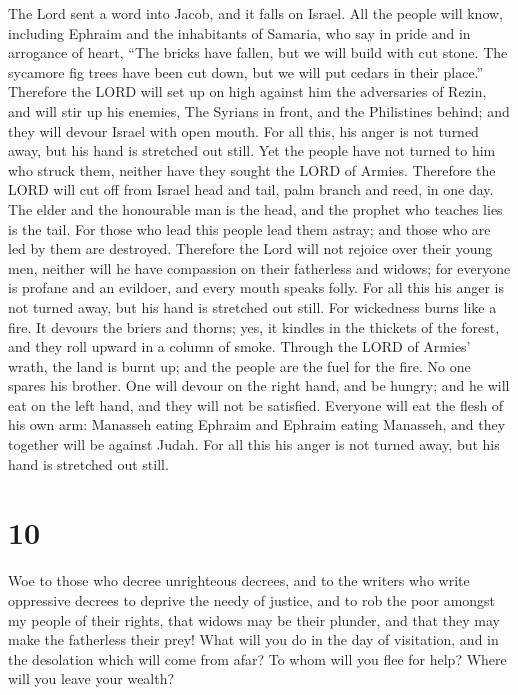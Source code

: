  The Lord sent a word into Jacob, and it falls on Israel.
 All the people will know, including Ephraim and the
inhabitants of Samaria, who say in pride and in arrogance of heart,
 ``The bricks have fallen, but we will build with cut
stone. The sycamore fig trees have been cut down, but we will put cedars
in their place.''  Therefore the LORD will set up on high
against him the adversaries of Rezin, and will stir up his enemies,
 The Syrians in front, and the Philistines behind; and
they will devour Israel with open mouth. For all this, his anger is not
turned away, but his hand is stretched out still.  Yet
the people have not turned to him who struck them, neither have they
sought the LORD of Armies.  Therefore the LORD will cut
off from Israel head and tail, palm branch and reed, in one day.
 The elder and the honourable man is the head, and the
prophet who teaches lies is the tail.  For those who lead
this people lead them astray; and those who are led by them are
destroyed.  Therefore the Lord will not rejoice over
their young men, neither will he have compassion on their fatherless and
widows; for everyone is profane and an evildoer, and every mouth speaks
folly. For all this his anger is not turned away, but his hand is
stretched out still.  For wickedness burns like a fire.
It devours the briers and thorns; yes, it kindles in the thickets of the
forest, and they roll upward in a column of smoke. 
Through the LORD of Armies' wrath, the land is burnt up; and the people
are the fuel for the fire. No one spares his brother. 
One will devour on the right hand, and be hungry; and he will eat on the
left hand, and they will not be satisfied. Everyone will eat the flesh
of his own arm:  Manasseh eating Ephraim and Ephraim
eating Manasseh, and they together will be against Judah. For all this
his anger is not turned away, but his hand is stretched out still.

\hypertarget{section-9}{%
\section{10}\label{section-9}}

 Woe to those who decree unrighteous decrees, and to the
writers who write oppressive decrees  to deprive the needy
of justice, and to rob the poor amongst my people of their rights, that
widows may be their plunder, and that they may make the fatherless their
prey!  What will you do in the day of visitation, and in
the desolation which will come from afar? To whom will you flee for
help? Where will you leave your wealth?

